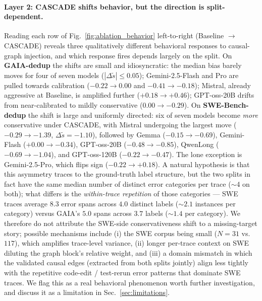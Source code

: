 \paragraph{Layer 2: CASCADE shifts behavior, but the direction is split-dependent.}
Reading each row of Fig.~\ref{fig:ablation_behavior} left-to-right
(Baseline $\to$ CASCADE) reveals three qualitatively different
behavioral responses to causal-graph injection, and which response
fires depends largely on the split. On \textbf{GAIA-dedup} the
shifts are small and idiosyncratic: the median bias barely moves
for four of seven models ($|\Delta\tilde s|{\leq}0.05$);
Gemini-2.5-Flash and Pro are pulled towards calibration
($-0.22 \to 0.00$ and $-0.41 \to -0.18$); Mistral, already
aggressive at Baseline, is amplified further
($+0.18 \to +0.46$); GPT-oss-20B drifts from near-calibrated to
mildly conservative ($0.00 \to -0.29$). On
\textbf{SWE-Bench-dedup} the shift is large and uniformly directed:
six of seven models become \emph{more} conservative under CASCADE,
with Mistral undergoing the largest move
($-0.29 \to -1.39$, $\Delta\tilde s = -1.10$),
followed by Gemma ($-0.15 \to -0.69$), Gemini-Flash
($+0.00 \to -0.34$), GPT-oss-20B ($-0.48 \to -0.85$),
QwenLong ($-0.69 \to -1.04$), and GPT-oss-120B ($-0.22 \to -0.47$).
The lone exception is Gemini-2.5-Pro, which flips sign
($-0.22 \to +0.18$).
A natural hypothesis is that this asymmetry traces to the
ground-truth label structure, but the two splits in fact have the
same median number of distinct error categories per trace ($\sim$4
on both); what differs is the \emph{within-trace repetition} of
those categories — SWE traces average $8.3$ error spans across
$4.0$ distinct labels (${\sim}2.1$ instances per category) versus
GAIA's $5.0$ spans across $3.7$ labels (${\sim}1.4$ per category).
We therefore do not attribute the SWE-side conservativeness shift
to a missing-target story; possible mechanisms include (i) the
SWE corpus being small ($N{=}31$ vs.\ $117$), which amplifies
trace-level variance, (ii) longer per-trace context on SWE
diluting the graph block's relative weight, and (iii) a domain
mismatch in which the validated causal edges (extracted from
both splits jointly) align less tightly with the repetitive
code-edit / test-rerun error patterns that dominate SWE traces.
We flag this as a real behavioral phenomenon worth further
investigation, and discuss it as a limitation in
Sec.~\ref{sec:limitations}.

